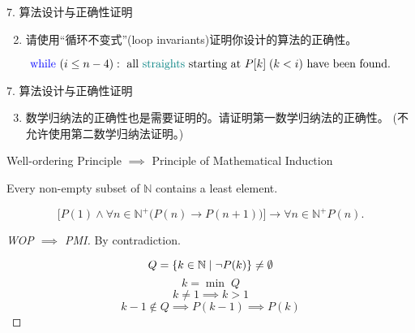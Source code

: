 \begin{frame}{}
  \begin{exampleblock}{$7.$ 算法设计与正确性证明}
    \begin{enumerate}[(1)]
      \setcounter{enumi}{1}
      \item 请使用``循环不变式''\;(loop invariants)证明你设计的算法的正确性。
    \end{enumerate}
  \end{exampleblock}


  \pause
  \vspace{-0.80cm}
  \[
    \text{\textcolor{blue}{while} } (i \le n - 4): \text{ all \textcolor{teal}{straights} starting at } P[k]\;(k < i) \text{ have been found.}
  \]
\end{frame}

\begin{frame}{}
  \begin{exampleblock}{$7.$ 算法设计与正确性证明}
    \begin{enumerate}[(1)]
      \setcounter{enumi}{2}
      \item 数学归纳法的正确性也是需要证明的。请证明第一数学归纳法的正确性。 
	(不允许使用第二数学归纳法证明。)
    \end{enumerate}
  \end{exampleblock}

  \pause
  \vspace{0.60cm}
  \centerline{Well-ordering Principle $\implies$ Principle of Mathematical Induction}
\end{frame}

\begin{frame}{}
  \begin{definition}
    Every non-empty subset of $\mathbb{N}$ contains a least element.
  \end{definition}

  \pause
  \vspace{0.20cm}
  \begin{definition}
  \[
    \Big[ P(1) \land \forall n \in \mathbb{N}^{+} \big(P(n) \to P(n+1) \big) \Big]
      \to \forall n \in \mathbb{N}^{+} P(n).
  \]
  \end{definition}

  \pause
  \begin{proof}[WOP $\implies$ PMI]
    \centerline{\large By contradiction.}

    \pause
    \[
      Q = \{k \in \mathbb{N} \mid \lnot P(k)\} \neq \emptyset
    \]
    \pause
    \vspace{-0.50cm}
    \[
      k = \min\; Q
    \]
    \pause
    \vspace{-0.50cm}
    \[
      k \neq 1 \implies k > 1 
    \]
    \pause
    \vspace{-0.50cm}
    \[
      k-1 \notin Q \implies P(k-1) \implies P(k)
    \]
  \end{proof}
\end{frame}
